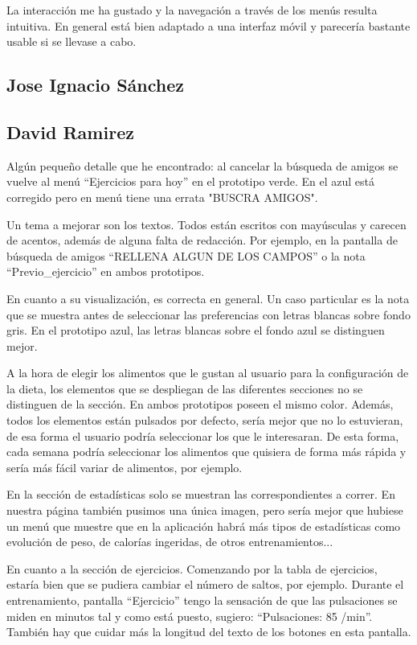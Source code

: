 \documentclass[a4paper]{article}
\begin{document}
La interacción me ha gustado y la navegación a través de los menús resulta intuitiva. En general está bien adaptado a una interfaz móvil y parecería bastante usable si se llevase a cabo.

\subsection{Jose Ignacio Sánchez}

\subsection{David Ramirez}

Algún pequeño detalle que he encontrado: al cancelar la búsqueda de amigos se vuelve al menú ``Ejercicios para hoy'' en el prototipo verde. En el azul está corregido pero en menú tiene una errata "BUSCRA AMIGOS".

Un tema a mejorar son los textos. Todos están escritos con mayúsculas y carecen de acentos, además de alguna falta de redacción. Por ejemplo, en la pantalla de búsqueda de amigos ``RELLENA ALGUN DE LOS CAMPOS'' o la nota ``Previo\_ejercicio'' en ambos prototipos.

En cuanto a su visualización, es correcta en general. Un caso particular es la nota que se muestra antes de seleccionar las preferencias con letras blancas sobre fondo gris. En el prototipo azul, las letras blancas sobre el fondo azul se distinguen mejor.

A la hora de elegir los alimentos que le gustan al usuario para la configuración de la dieta, los elementos que se despliegan de las diferentes secciones no se distinguen de la sección. En ambos prototipos poseen el mismo color. Además, todos los elementos están pulsados por defecto, sería mejor que no lo estuvieran, de esa forma el usuario podría seleccionar los que le interesaran. De esta forma, cada semana podría seleccionar los alimentos que quisiera de forma más rápida y sería más fácil variar de alimentos, por ejemplo.

En la sección de estadísticas solo se muestran las correspondientes a correr. En nuestra página también pusimos una única imagen, pero sería mejor que hubiese un menú que muestre que en la aplicación habrá más tipos de estadísticas como evolución de peso, de calorías ingeridas, de otros entrenamientos...

En cuanto a la sección de ejercicios. Comenzando por la tabla de ejercicios, estaría bien que se pudiera cambiar el número de saltos, por ejemplo. Durante el entrenamiento, pantalla ``Ejercicio'' tengo la sensación de que las pulsaciones se miden en minutos tal y como está puesto, sugiero: ``Pulsaciones: 85 /min''. También hay que cuidar más la longitud del texto de los botones en esta pantalla.
\end{document}

